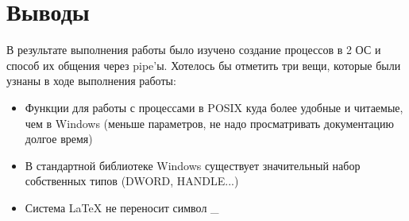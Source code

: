 \section{Выводы}

В результате выполнения работы было изучено создание процессов в 2 ОС и способ их общения через pipe'ы.
Хотелось бы отметить три вещи, которые были узнаны в ходе выполнения работы:
\begin{itemize}
  \item Функции для работы с процессами в POSIX куда более удобные и читаемые, чем в Windows (меньше параметров, не надо просматривать документацию долгое время)
  \item В стандартной библиотеке Windows существует значительный набор собственных типов (DWORD, HANDLE...)
  \item Система LaTeX не переносит символ \_
\end{itemize}

\pagebreak
